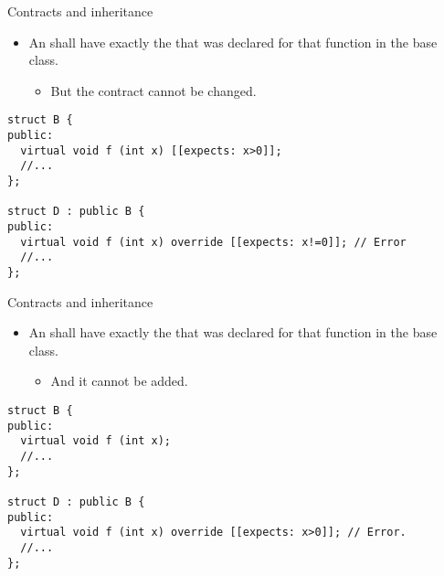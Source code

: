 \begin{frame}[t,fragile]{Contracts and inheritance}
\begin{itemize}
  \item An  shall have exactly the  that was declared for that function in the base class.
    \begin{itemize}
      \item But the contract cannot be changed.
    \end{itemize}
\end{itemize}

\vfill\pause

\begin{lstlisting}
struct B {
public:
  virtual void f (int x) [[expects: x>0]];
  //...
};

struct D : public B {
public:
  virtual void f (int x) override [[expects: x!=0]]; // Error
  //...
};
\end{lstlisting}
\end{frame}

\begin{frame}[t,fragile]{Contracts and inheritance}
\begin{itemize}
  \item An  shall have exactly the  that was declared for that function in the base class.
    \begin{itemize}
      \item And it cannot be added.
    \end{itemize}
\end{itemize}

\vfill\pause

\begin{lstlisting}
struct B {
public:
  virtual void f (int x);
  //...
};

struct D : public B {
public:
  virtual void f (int x) override [[expects: x>0]]; // Error.
  //...
};
\end{lstlisting}
\end{frame}

